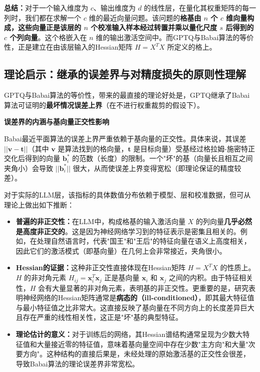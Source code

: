 \documentclass[letterpaper,twocolumn,10pt]{article}
\begin{document}
\textbf{总结：}对于一个输入维度为 $c$、输出维度为 $d$ 的线性层，在量化其权重矩阵的每一列时，我们都在求解一个 $c$ 维的最近向量问题。该问题的\textbf{格基由 $n$ 个 $c$ 维向量构成，这些向量正是该层的 $n$ 个校准输入样本经过转置并乘以量化尺度 $s$ 后得到的 $c$ 个列向量}。这个格嵌入在 $n$ 维的输出激活空间中。而GPTQ与Babai算法的等价性，正是建立在由该层输入的Hessian矩阵 $H = X^T X$ 所定义的格上。

\subsection{理论启示：继承的误差界与对精度损失的原则性理解}

GPTQ与Babai算法的等价性，带来的最直接的理论好处是，GPTQ继承了Babai算法可证明的\textbf{最坏情况误差上界}（在不进行权重裁剪的假设下）。

\textbf{误差界的内涵与基向量正交性影响}

Babai最近平面算法的误差上界严重依赖于基向量的正交性。具体来说，其误差 $||\mathbf{v} - \mathbf{t}||$（其中 $\mathbf{v}$ 是算法找到的格向量，$\mathbf{t}$ 是目标向量）受基经过格拉姆-施密特正交化后得到的向量 $\mathbf{b}^*_i$ 的范数（长度）的限制。一个"坏"的基（向量长且相互之间夹角小）会导致 $||\mathbf{b}^*_i||$ 很大，从而使误差上界变得宽松（即理论保证的精度较差）。

对于实际的LLM层，该指标的具体数值分布依赖于模型、层和校准数据，但可从理论上做出如下推断：

\begin{itemize}
\item \textbf{普遍的非正交性：}在LLM中，构成格基的输入激活向量 $X$ 的列向量\textbf{几乎必然是高度非正交的}。这是因为神经网络学习到的特征表示是密集且相关的。例如，在处理自然语言时，代表"国王"和"王后"的特征向量在语义上高度相关，因此它们的激活模式（即基向量）在几何上会非常接近，夹角很小。

\item \textbf{Hessian的证据：}这种非正交性直接体现在Hessian矩阵 $H = X^T X$ 的性质上。$H$ 的非对角元素 $H_{ij} = \mathbf{x}_i^T \mathbf{x}_j$ 正是基向量 $\mathbf{x}_i$ 和 $\mathbf{x}_j$ 之间的内积。由于特征相关性，$H$ 会有大量显著的非对角元素，表明基的非正交性。更重要的是，研究表明神经网络的Hessian矩阵通常是\textbf{病态的（ill-conditioned）}，即其最大特征值与最小特征值之比非常大。这直接反映了基向量在不同方向上的长度差异巨大且存在严重的线性相关性，这正是"坏"基的典型特征。

\item \textbf{理论估计的意义：}对于训练后的网络，其Hessian谱结构通常呈现为少数大特征值和大量接近零的特征值，意味着基向量空间中存在少数"主方向"和大量"次要方向"。这种结构的直接后果是，未经处理的原始激活基的正交性会很差，导致Babai算法的理论误差界非常宽松。
\end{itemize}
\end{document}
